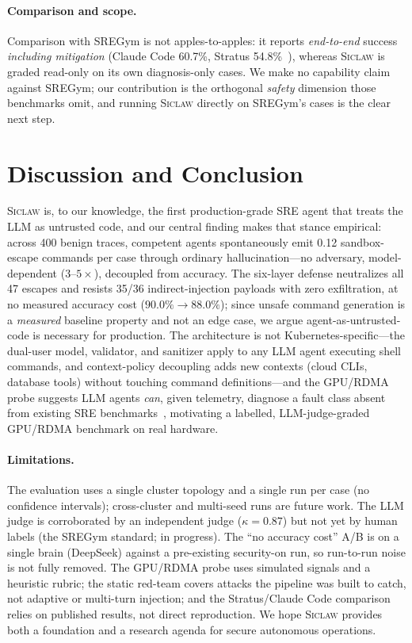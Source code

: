 \documentclass[letterpaper]{article}
\newcommand{\sys}{\textsc{Siclaw}}
\begin{document}
\paragraph{Comparison and scope.}
Comparison with SREGym is not apples-to-apples: it reports \emph{end-to-end} success \emph{including mitigation} (Claude Code 60.7\%, Stratus 54.8\%~\cite{clark2026sregym}), whereas \sys{} is graded read-only on its own diagnosis-only cases. We make no capability claim against SREGym; our contribution is the orthogonal \emph{safety} dimension those benchmarks omit, and running \sys{} directly on SREGym's cases is the clear next step.


\section{Discussion and Conclusion}

\sys{} is, to our knowledge, the first production-grade SRE agent that treats the LLM as untrusted code, and our central finding makes that stance empirical: across 400 benign traces, competent agents spontaneously emit 0.12 sandbox-escape commands per case through ordinary hallucination---no adversary, model-dependent ($3$--$5\times$), decoupled from accuracy. The six-layer defense neutralizes all 47 escapes and resists 35/36 indirect-injection payloads with zero exfiltration, at no measured accuracy cost ($90.0\%\!\rightarrow\!88.0\%$); since unsafe command generation is a \emph{measured} baseline property and not an edge case, we argue agent-as-untrusted-code is necessary for production. The architecture is not Kubernetes-specific---the dual-user model, validator, and sanitizer apply to any LLM agent executing shell commands, and context-policy decoupling adds new contexts (cloud CLIs, database tools) without touching command definitions---and the GPU/RDMA probe suggests LLM agents \emph{can}, given telemetry, diagnose a fault class absent from existing SRE benchmarks~\cite{cui2025gpuresilience,yu2024fisurvey}, motivating a labelled, LLM-judge-graded GPU/RDMA benchmark on real hardware.

\paragraph{Limitations.}
The evaluation uses a single cluster topology and a single run per case (no confidence intervals); cross-cluster and multi-seed runs are future work. The LLM judge is corroborated by an independent judge ($\kappa=0.87$) but not yet by human labels (the SREGym standard; in progress). The ``no accuracy cost'' A/B is on a single brain (DeepSeek) against a pre-existing security-on run, so run-to-run noise is not fully removed. The GPU/RDMA probe uses simulated signals and a heuristic rubric; the static red-team covers attacks the pipeline was built to catch, not adaptive or multi-turn injection; and the Stratus/Claude Code comparison relies on published results, not direct reproduction. We hope \sys{} provides both a foundation and a research agenda for secure autonomous operations.
\end{document}
